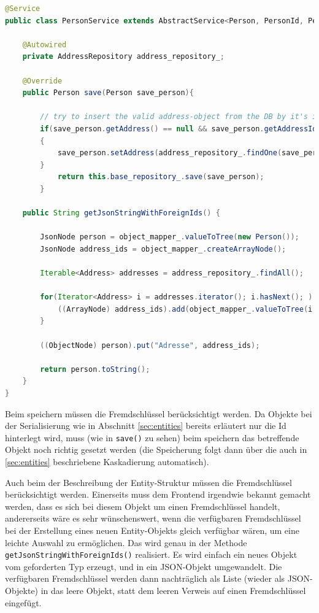 \scriptsize
\begin{lstlisting}[caption=PersonService.java, label=cs:PersonService, language=Java]
@Service
public class PersonService extends AbstractService<Person, PersonId, PersonRepository>{

	@Autowired
	private AddressRepository address_repository_;
	
	@Override
	public Person save(Person save_person){
	
		// try to insert the valid address-object from the DB by it's id (from JSON)
		if(save_person.getAddress() == null && save_person.getAddressId() != null)
		{
			save_person.setAddress(address_repository_.findOne(save_person.getAddressId()));
		}
			return this.base_repository_.save(save_person);
		}
	
	public String getJsonStringWithForeignIds() {
	
		JsonNode person = object_mapper_.valueToTree(new Person());
		JsonNode address_ids = object_mapper_.createArrayNode();
		
		Iterable<Address> addresses = address_repository_.findAll();
		
		for(Iterator<Address> i = addresses.iterator(); i.hasNext(); ) {
			((ArrayNode) address_ids).add(object_mapper_.valueToTree(i.next().getId()));
		}
		
		((ObjectNode) person).put("Adresse", address_ids);
		
		return person.toString();
	}
}
\end{lstlisting}
\normalsize

Beim speichern müssen die Fremdschlüssel berücksichtigt werden. Da Objekte bei der Serialisierung wie in Abschnitt \ref{sec:entities} bereits erläutert nur die Id hinterlegt wird, muss (wie in \verb|save()| zu sehen) beim speichern das betreffende Objekt noch richtig gesetzt werden (die Speicherung folgt dann über die auch in \ref{sec:entities} beschriebene Kaskadierung automatisch).

Auch beim der Beschreibung der Entity-Struktur müssen die Fremdschlüssel berücksichtigt werden. Einerseits muss dem Frontend irgendwie bekannt gemacht werden, dass es sich bei diesem Objekt um einen Fremdschlüssel handelt, andererseits wäre es sehr wünschenswert, wenn die verfügbaren Fremdschlüssel bei der Erstellung eines neuen Entity-Objekts gleich verfügbar wären, um eine leichte Auswahl zu ermöglichen. Das wird genau in der Methode  \verb|getJsonStringWithForeignIds()| realisiert. Es wird einfach ein neues Objekt vom geforderten Typ erzeugt, und in ein JSON-Objekt umgewandelt. Die verfügbaren Fremdschlüssel werden dann nachträglich als Liste (wieder als JSON-Objekte) in das leere Objekt, statt dem leeren Verweis auf einen Fremdschlüssel eingefügt. 

